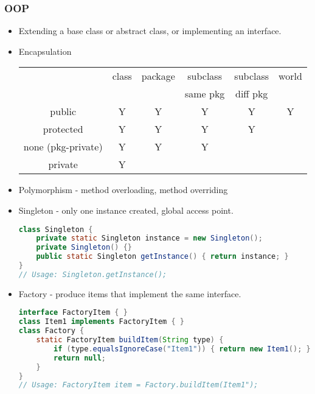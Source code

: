 \documentclass[10pt]{article}
\begin{document}
\subsubsection{OOP}
\begin{itemize}
    \item Extending a base class or abstract class, or implementing an interface.
    \item Encapsulation\\
    \begin{tabular}{|c|c|c|c|c|c|}
    \hline
         & class & package & subclass & subclass & world \\
         & & & same pkg & diff pkg &\\
         \hline
        public & Y & Y & Y & Y & Y\\
        protected & Y & Y & Y & Y & \\
        none (pkg-private) & Y & Y & Y & & \\
        private & Y & & & &\\
        \hline
    \end{tabular}
    \item Polymorphism - method overloading, method overriding
    \item Singleton - only one instance created, global access point.
\begin{lstlisting}[language=java]
class Singleton {
    private static Singleton instance = new Singleton();
    private Singleton() {}
    public static Singleton getInstance() { return instance; }
}
// Usage: Singleton.getInstance();
\end{lstlisting}
    \item Factory - produce items that implement the same interface.
\begin{lstlisting}[language=java]
interface FactoryItem { }
class Item1 implements FactoryItem { }
class Factory {
    static FactoryItem buildItem(String type) {
        if (type.equalsIgnoreCase("Item1")) { return new Item1(); }
        return null;
    }
}
// Usage: FactoryItem item = Factory.buildItem(Item1");
\end{lstlisting}

\begin{comment}
    \item Builder - method chaining makes it easier to set multiple fields.
\begin{lstlisting}[language=java]
public class Item {
    private final int field1;
    private Item() {}
    Item(Builder builder) { field1 = builder.field1; }
    static class Builder {
        private int field1;
        private Builder();
        static Builder newInstance() { return new Builder(); }
        Builder setField1(int field1) {
            this.field1 = field1;
            return this;
        }
        Item build() { return new Item(this); }
    }
}
// Usage: Item.Builder.newInstance().setField1(1)./*...*/.build();
\end{lstlisting}


\end{comment}
\end{itemize}
\end{document}
